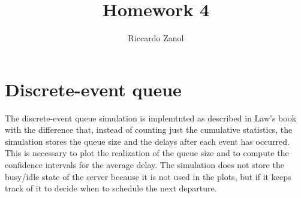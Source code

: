 \documentclass[a4paper,oneside]{article}
\author{Riccardo Zanol}
\title{Homework 4}
\begin{document}
\maketitle
\section{Discrete-event queue}

The discrete-event queue simulation is implemtnted as described in
Law's book with the difference that, instead of counting just the
cumulative statistics, the simulation stores the queue size and the
delays after each event has occurred. This is necessary to plot the
realization of the queue size and to compute the confidence intervals
for the average delay. The simulation does not store the busy/idle
state of the server because it is not used in the plots, but if it
keeps track of it to decide when to schedule the next departure.
\end{document}
